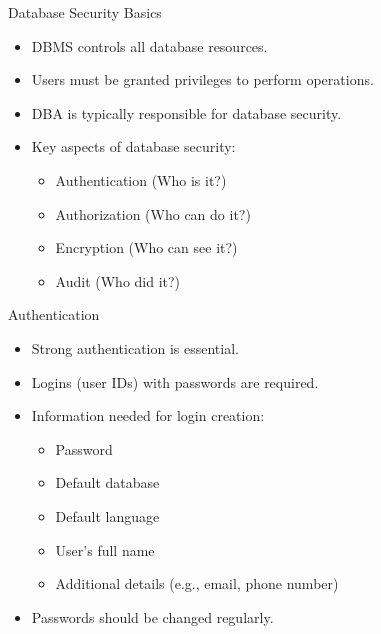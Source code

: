 \documentclass{beamer}
\begin{document}
\begin{frame}{Database Security Basics}
  \begin{itemize}
    \item DBMS controls all database resources.
    \item Users must be granted privileges to perform operations.
    \item DBA is typically responsible for database security.
    \item Key aspects of database security:
      \begin{itemize}
        \item Authentication (Who is it?)
        \item Authorization (Who can do it?)
        \item Encryption (Who can see it?)
        \item Audit (Who did it?)
      \end{itemize}
  \end{itemize}
\end{frame}

\begin{frame}{Authentication}
  \begin{itemize}
    \item Strong authentication is essential.
    \item Logins (user IDs) with passwords are required.
    \item Information needed for login creation:
      \begin{itemize}
        \item Password
        \item Default database
        \item Default language
        \item User's full name
        \item Additional details (e.g., email, phone number)
      \end{itemize}
    \item Passwords should be changed regularly.
  \end{itemize}
\end{frame}
\end{document}
